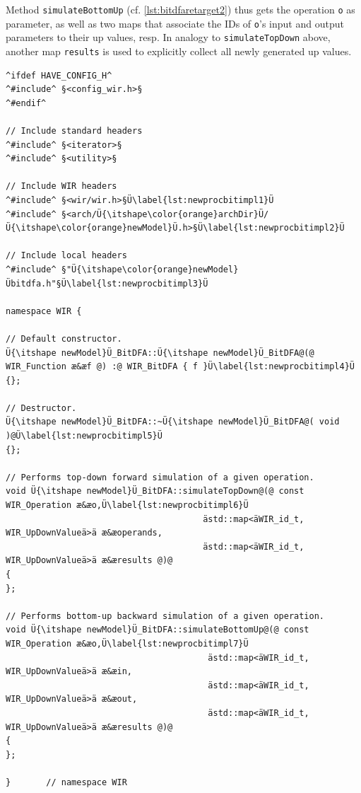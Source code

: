 Method \texttt{simulateBottomUp} (cf. \cref{lst:bitdfaretarget2}) thus gets the operation \texttt{o} as parameter, as well as two maps that associate the IDs of \texttt{o}'s input and output parameters to their up values, resp.
In analogy to \texttt{simulateTopDown} above, another map \texttt{results} is used to explicitly collect all newly generated up values.

\begin{lstlisting}[style=code,float=!t,caption={Rudimentary Implementation of a New Processor Model's Bit-True Data Flow Analysis},label=lst:newprocbitimpl]
^ifdef HAVE_CONFIG_H^
^#include^ §<config_wir.h>§
^#endif^

// Include standard headers
^#include^ §<iterator>§
^#include^ §<utility>§

// Include WIR headers
^#include^ §<wir/wir.h>§Ü\label{lst:newprocbitimpl1}Ü
^#include^ §<arch/Ü{\itshape\color{orange}archDir}Ü/Ü{\itshape\color{orange}newModel}Ü.h>§Ü\label{lst:newprocbitimpl2}Ü

// Include local headers
^#include^ §"Ü{\itshape\color{orange}newModel}Übitdfa.h"§Ü\label{lst:newprocbitimpl3}Ü

namespace WIR {

// Default constructor.
Ü{\itshape newModel}Ü_BitDFA::Ü{\itshape newModel}Ü_BitDFA@(@ WIR_Function æ&æf @) :@ WIR_BitDFA { f }Ü\label{lst:newprocbitimpl4}Ü
{};

// Destructor.
Ü{\itshape newModel}Ü_BitDFA::~Ü{\itshape newModel}Ü_BitDFA@( void )@Ü\label{lst:newprocbitimpl5}Ü
{};

// Performs top-down forward simulation of a given operation.
void Ü{\itshape newModel}Ü_BitDFA::simulateTopDown@(@ const WIR_Operation æ&æo,Ü\label{lst:newprocbitimpl6}Ü
                                       ästd::map<äWIR_id_t, WIR_UpDownValueä>ä æ&æoperands,
                                       ästd::map<äWIR_id_t, WIR_UpDownValueä>ä æ&æresults @)@
{
};

// Performs bottom-up backward simulation of a given operation.
void Ü{\itshape newModel}Ü_BitDFA::simulateBottomUp@(@ const WIR_Operation æ&æo,Ü\label{lst:newprocbitimpl7}Ü
                                        ästd::map<äWIR_id_t, WIR_UpDownValueä>ä æ&æin,
                                        ästd::map<äWIR_id_t, WIR_UpDownValueä>ä æ&æout,
                                        ästd::map<äWIR_id_t, WIR_UpDownValueä>ä æ&æresults @)@
{
};

}       // namespace WIR
\end{lstlisting}


